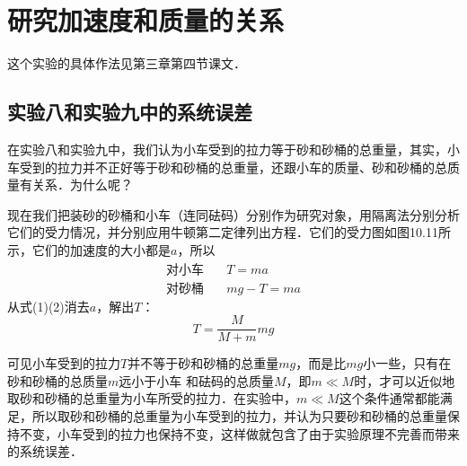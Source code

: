 \section{研究加速度和质量的关系}
这个实验的具体作法见第三章第四节课文．

\subsection*{实验八和实验九中的系统误差}
在实验八和实验九中，我们认为小车受到的拉力等于砂和砂桶的总重量，其实，小车受到的拉力并不正好等于砂和砂桶的总重量，还跟小车的质量、砂和砂桶的总质量有关系．为什么呢？

\begin{figure}[htp]\centering
\qquad \qquad 
    \caption{}
\end{figure}	

现在我们把装砂的砂桶和小车（连同砝码）分别作为研究对象，用隔离法分别分析它们的受力情况，并分别应用牛顿第二定律列出方程．它们的受力图如图10.11所示，它们的加速度的大小都是$a$，所以
\begin{align}
    \text{对小车}&\quad T=ma\\
    \text{对砂桶}&\quad mg-T=ma
\end{align}
从式(1)(2)消去$a$，解出$T$：
\begin{equation}
    T=\frac{M}{M+m}mg
\end{equation}

可见小车受到的拉力$T$并不等于砂和砂桶的总重量$mg$，而是比$mg$小一些，只有在砂和砂桶的总质量$m$远小于小车
和砝码的总质量$M$，即$m\ll M$时，才可以近似地取砂和砂桶的总重量为小车所受的拉力．在实验中，$m\ll M$这个条件通常都能满足，所以取砂和砂桶的总重量为小车受到的拉力，并认为只要砂和砂桶的总重量保持不变，小车受到的拉力也保持不变，这样做就包含了由于实验原理不完善而带来的系统误差．

